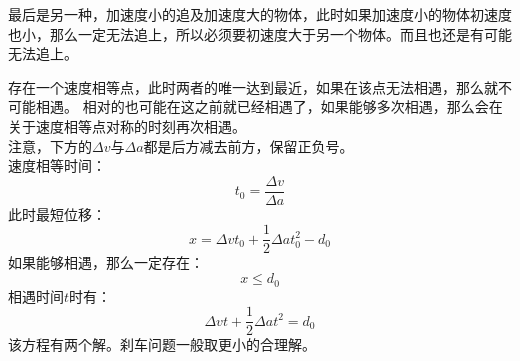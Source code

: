 \begin{casetypebox}[title={\strut\textcolor{white}{\bfseries 常见题型：追击相遇问题（小追大）}}]
  最后是另一种，加速度小的追及加速度大的物体，此时如果加速度小的物体初速度也小，那么一定无法追上，所以必须要初速度大于另一个物体。而且也还是有可能无法追上。
  \begin{center}
  \end{center}
  存在一个速度相等点，此时两者的唯一达到最近，如果在该点无法相遇，那么就不可能相遇。
  相对的也可能在这之前就已经相遇了，如果能够多次相遇，那么会在关于速度相等点对称的时刻再次相遇。\\
  注意，下方的$\Delta v$与$\Delta a$都是后方减去前方，保留正负号。\\
  速度相等时间：
  \[
    t_0=\frac{\Delta v}{\Delta a}
  \]
  此时最短位移：
  \[
    x=\Delta v t_0+\frac{1}{2}\Delta a t_0^2-d_0
  \]
  如果能够相遇，那么一定存在：
  \[
    x\leq d_0
  \]
  相遇时间$t$时有：
  \[
    \Delta v t+\frac{1}{2}\Delta a t^2=d_0
  \]
  该方程有两个解。刹车问题一般取更小的合理解。

\end{casetypebox}
